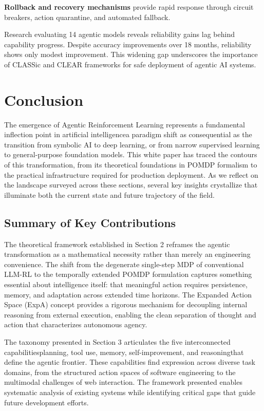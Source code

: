 \textbf{Rollback and recovery mechanisms} provide rapid response through circuit breakers, action quarantine, and automated fallback.

Research evaluating 14 agentic models reveals reliability gains lag behind capability progress. Despite accuracy improvements over 18 months, reliability shows only modest improvement. This widening gap underscores the importance of CLASSic and CLEAR frameworks for safe deployment of agentic AI systems.
\section{ Conclusion}

The emergence of Agentic Reinforcement Learning represents a fundamental inflection point in artificial intelligencea paradigm shift as consequential as the transition from symbolic AI to deep learning, or from narrow supervised learning to general-purpose foundation models. This white paper has traced the contours of this transformation, from its theoretical foundations in POMDP formalism to the practical infrastructure required for production deployment. As we reflect on the landscape surveyed across these sections, several key insights crystallize that illuminate both the current state and future trajectory of the field.

\subsection{Summary of Key Contributions}

The theoretical framework established in Section 2 reframes the agentic transformation as a mathematical necessity rather than merely an engineering convenience. The shift from the degenerate single-step MDP of conventional LLM-RL to the temporally extended POMDP formulation captures something essential about intelligence itself: that meaningful action requires persistence, memory, and adaptation across extended time horizons. The Expanded Action Space (ExpA) concept provides a rigorous mechanism for decoupling internal reasoning from external execution, enabling the clean separation of thought and action that characterizes autonomous agency.

The taxonomy presented in Section 3 articulates the five interconnected capabilitiesplanning, tool use, memory, self-improvement, and reasoningthat define the agentic frontier. These capabilities find expression across diverse task domains, from the structured action spaces of software engineering to the multimodal challenges of web interaction. The framework presented enables systematic analysis of existing systems while identifying critical gaps that guide future development efforts.

